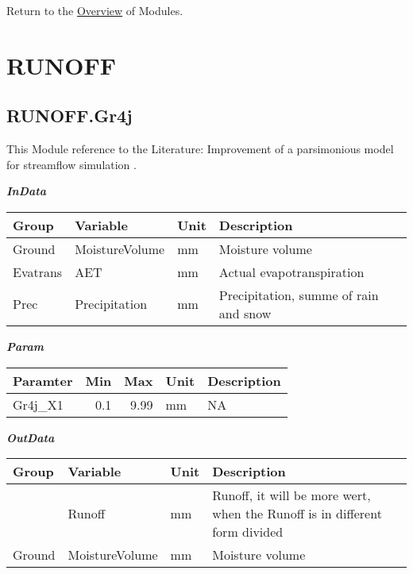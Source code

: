 \documentclass[
]{book}
\begin{document}
Return to the \protect\hyperlink{module}{Overview} of Modules.

\hypertarget{RUNOFF}{%
\section{RUNOFF}\label{RUNOFF}}

\hypertarget{RUNOFF.Gr4j}{%
\subsection{RUNOFF.Gr4j}\label{RUNOFF.Gr4j}}

This Module reference to the Literature: Improvement of a parsimonious model for streamflow simulation \citep{Perrin.2003}.

\textbf{\emph{InData}}

\begin{table}[!h]
\centering
\begin{tabular}{l|l|l|l}
\hline
Group & Variable & Unit & Description\\
\hline
Ground & MoistureVolume & mm & Moisture volume\\
\cline{1-4}
Evatrans & AET & mm & Actual evapotranspiration\\
\cline{1-4}
Prec & Precipitation & mm & Precipitation, summe of rain and snow\\
\hline
\end{tabular}
\end{table}

\textbf{\emph{Param}}

\begin{table}[!h]
\centering
\begin{tabular}{l|r|r|l|l}
\hline
Paramter & Min & Max & Unit & Description\\
\hline
Gr4j\_X1 & 0.1 & 9.99 & mm & NA\\
\hline
\end{tabular}
\end{table}

\textbf{\emph{OutData}}

\begin{table}[!h]
\centering
\begin{tabular}{l|l|l|l}
\hline
Group & Variable & Unit & Description\\
\hline
 & Runoff & mm & Runoff, it will be more wert, when the Runoff is in different form divided\\
\cline{2-4}
\multirow{-2}{*}{\raggedright\arraybackslash Ground} & MoistureVolume & mm & Moisture volume\\
\hline
\end{tabular}
\end{table}
\end{document}
